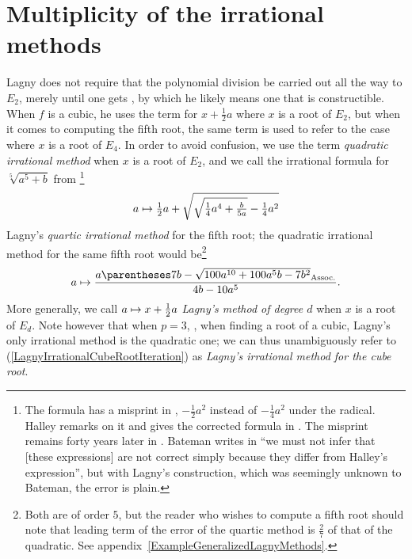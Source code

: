 ﻿\documentclass[10pt, a4paper, twoside]{basestyle}
\begin{document}
\section*{Multiplicity of the irrational methods}
Lagny does not require that the polynomial division be carried out
all the way to $E_2$, merely until one gets
%
, by which he likely means
one that is constructible. When $f$ is a cubic, he uses the term  for $x+\frac{1}{2}a$ where
$x$ is a root of $E_2$, but when it comes to computing the fifth root, the same term is used to refer to the case where $x$ is a root of
$E_4$. In order to avoid confusion, we use the term \emph{quadratic irrational method} when $x$ is a root of $E_2$,
and we call the irrational formula for $\sqrt[5]{a^5+b}$ from \cite[43]{FantetdeLagny1692}\footnote{The formula has a misprint in
\cite[43]{FantetdeLagny1692}, $-\tfrac{1}{2}a^2$ instead of $-\tfrac{1}{4}a^2$ under the radical.
Halley remarks on it and gives the corrected formula in \cite[137,140]{Halley1694}.
The misprint remains forty years later in \cite[\pno~440 misnumbered 340]{FantetdeLagny1733}.
Bateman writes in \cite{Bateman1938} ``we must not infer that [these expressions] are not correct simply because
they differ from Halley's expression'', but with Lagny's construction, which was seemingly unknown to Bateman, the
error is plain.}\[
\FunctionBody{a}{\tfrac{1}{2}a+\sqrt{\sqrt{\tfrac{1}{4}a^4+\tfrac{b}{5a}}-\tfrac{1}{4}a^2}}
\]
Lagny's \emph{quartic irrational method} for the fifth root;
the quadratic irrational method for the same fifth root would be\footnote{Both are of order $5$, but the reader who wishes
to compute a fifth root should note that leading term of the error of the quartic method is
$\frac{2}{7}$ of that of the quadratic. See appendix~\ref{ExampleGeneralizedLagnyMethods}.}\[
\FunctionBody{a}{\frac{a\pa{7b-\sqrt{100a^{10}+100a^{5}b-7b^2}}}{4b-10a^5}}\text.
\]
More generally, we call $\FunctionBody{a}{x+\frac{1}{2}a}$ \emph{Lagny's method of degree $d$} when
$x$ is a root of $E_{d}$.
Note however that when $p=3$, \idest, when finding a root of a cubic, Lagny's only irrational method
is the quadratic one; we can thus unambiguously refer to (\ref{LagnyIrrationalCubeRootIteration}) as \emph{Lagny's irrational method for the cube root}.
\end{document}
